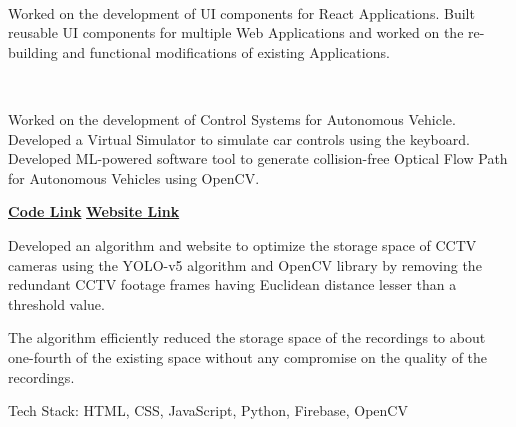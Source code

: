 \documentclass[a4paper]{MagicalCV}
\begin{document}
\hfill
\begin{minipage}[t]{0.66\textwidth} 


 \\
\vspace{\topsep} %
\begin{tightemize}
\item \justify Worked on the development of UI components for React Applications. Built reusable UI components for multiple Web Applications and worked on the re-building and functional modifications of existing Applications.
\end{tightemize}
\sectionsep

 \\
\vspace{\topsep} %
\justify
\begin{tightemize}
\item Worked on the development of Control Systems for Autonomous Vehicle. Developed a Virtual Simulator to simulate car controls using the keyboard. Developed ML-powered software tool to generate collision-free Optical Flow Path for Autonomous Vehicles using OpenCV.
\end{tightemize}
\sectionsep


\vspace{\topsep} %
\justify
\begin{tightemize}
\item \href{https://github.com/satviktiwari/Minor-Project}{\bf Code Link} \textbullet{} \href{https://cctvprocessing.netlify.app/}{\bf Website Link}
\item Developed an algorithm and website to optimize the storage space of CCTV cameras using the YOLO-v5 algorithm and OpenCV library by removing the redundant CCTV footage frames having Euclidean distance lesser than a threshold value. 
\item The algorithm efficiently reduced the storage space of the recordings to about one-fourth of the existing space without any compromise on the quality of the recordings. 
\item  Tech Stack: HTML, CSS, JavaScript, Python, Firebase, OpenCV
\end{tightemize}
\sectionsep


\end{minipage}
\end{document}
